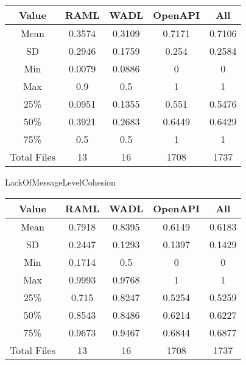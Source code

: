 \begin{center}
  \begin{tabular}{ c|c|c|c|c}
    \hline
     \label{table:WSIC}
     Value & RAML & WADL & OpenAPI & All \\ \hline
     Mean &0.3574 &0.3109 &0.7171 &0.7106 \\ \hline
     SD &0.2946&0.1759&0.254&0.2584 \\ \hline
     Min &0.0079&0.0886&0&0 \\ \hline
     Max &0.9&0.5&1&1 \\ \hline
     \rowcolor[HTML]{00FF00} 25\% &0.0951&0.1355&0.551&0.5476 \\ \hline
     \rowcolor[HTML]{7FFF00} 50\% &0.3921&0.2683&0.6449&0.6429 \\ \hline
     \rowcolor[HTML]{FFFF00} 75\% &0.5&0.5&1&1 \\ \hline
     Total Files &13&16&1708&1737 \\ \hline
  \end{tabular}
 \end{center}

LackOfMessageLevelCohesion

\begin{center}
  \begin{tabular}{ c|c|c|c|c}
    \hline
     \label{table:WSIC}
     Value & RAML & WADL & OpenAPI & All \\ \hline
     Mean &0.7918 &0.8395 &0.6149 &0.6183 \\ \hline
     SD &0.2447&0.1293&0.1397&0.1429 \\ \hline
     Min &0.1714&0.5&0&0 \\ \hline
     Max &0.9993&0.9768&1&1 \\ \hline
     \rowcolor[HTML]{00FF00} 25\% &0.715&0.8247&0.5254&0.5259 \\ \hline
     \rowcolor[HTML]{7FFF00} 50\% &0.8543&0.8486&0.6214&0.6227 \\ \hline
     \rowcolor[HTML]{FFFF00} 75\% &0.9673&0.9467&0.6844&0.6877 \\ \hline
     Total Files &13&16&1708&1737 \\ \hline
  \end{tabular}
 \end{center}

